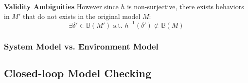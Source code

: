 \textbf{Validity Ambiguities}
However since $h$ is non-surjective, there exists behaviors in $M'$ that do not exists in the original model $M$:
$$\exists\delta'\in\mathbb{B}(M')\text{ s.t. }h^{-1}(\delta')\not\subset\mathbb{B}(M)$$

\subsubsection{System Model vs. Environment Model}
\subsection{Closed-loop Model Checking}
%
%
